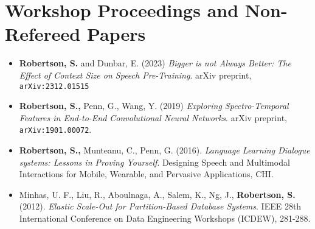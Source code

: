 \documentclass{article}
\begin{document}
\section{Workshop Proceedings and Non-Refereed Papers}
\begin{itemize}
  \item \textbf{Robertson, S.} and Dunbar, E. (2023) \textit{Bigger is not
    Always Better: The Effect of Context Size on Speech Pre-Training}. arXiv
    preprint, \texttt{arXiv:2312.01515}

  \item \textbf{Robertson, S.,} Penn, G., Wang, Y. (2019) \textit{Exploring
    Spectro-Temporal Features in End-to-End Convolutional Neural Networks}.
    arXiv preprint, \texttt{arXiv:1901.00072}.

  \item \textbf{Robertson, S.,} Munteanu, C., Penn, G. (2016).
    \textit{Language Learning Dialogue systems: Lessons in Proving Yourself}.
    Designing Speech and Multimodal Interactions for Mobile, Wearable, and
    Pervasive Applications, CHI.

  \item Minhas, U. F., Liu, R., Aboulnaga, A., Salem, K., Ng, J.,
    \textbf{Robertson, S.} (2012). \textit{Elastic Scale-Out for
    Partition-Based Database Systems}. IEEE 28th International Conference on
    Data Engineering Workshops (ICDEW), 281-288.
\end{itemize}
\end{document}
